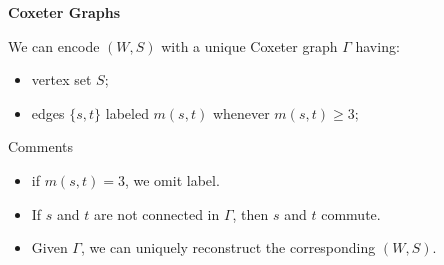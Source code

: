 \documentclass{beamer}
\begin{document}

\begin{frame}{\textbf{Coxeter Graphs}}

\begin{definition}
We can encode $(W,S)$ with a unique \alert{Coxeter graph} $\Gamma$ having: 

\begin{itemize}
\item vertex set $S$;

\item edges $\{s,t\}$ labeled $m(s,t)$ whenever $m(s,t)\geq 3;$



\end{itemize}

\vspace{-1em}

\end{definition}

\pause

\begin{block}{Comments}
\begin{itemize}

\item if $m(s,t)=3$, we omit label.

\item If $s$ and $t$ are not connected in $\Gamma$, then $s$ and $t$ 
commute.

\item Given $\Gamma$, we can uniquely reconstruct the corresponding $(W,S)
$. 

\end{itemize}

\end{block}

\end{frame}

\end{document}
